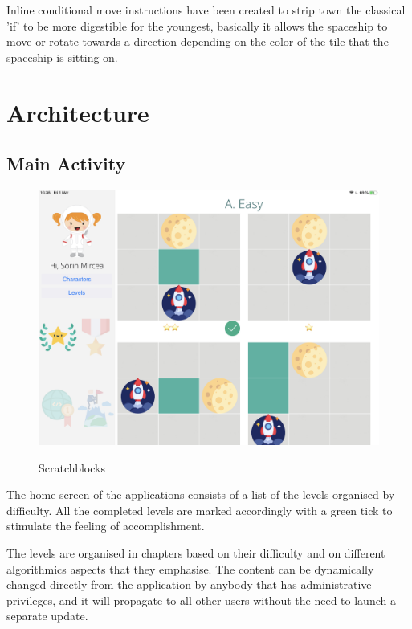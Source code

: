 \documentclass[12 pct]{report}
\begin{document}
Inline conditional move instructions have been created to strip town the classical 'if'  to be more digestible for the youngest, basically it allows the spaceship to move or rotate towards a direction depending on the color  of the tile that the spaceship is sitting on.
\section{Architecture}

\subsection*{Main Activity}
\begin{figure}[H]
\includegraphics[width=1.0\textwidth]{ArRobotCode0}
\centering
\label{fig:hololens}
\caption{Scratchblocks}
\end{figure}

The home screen of the applications consists of a list of the levels organised by difficulty. All the completed levels are marked accordingly with a green tick to stimulate the feeling of accomplishment. 

The levels are organised in chapters based on their difficulty and on different algorithmics aspects that they emphasise. The content can be dynamically changed directly from the application by anybody that has administrative privileges, and it will propagate to all other users without the need to launch a separate update.
\end{document}
